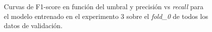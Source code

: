 \begin{figure}[H]
    \centering
    \caption{Curvas de F1-score en función del umbral y precisión vs \textit{recall} para el modelo entrenado en el experimento 3 sobre el \textit{fold\_0} de todos los datos de validación.}
    \label{fig:exp3-val-all-curves}
\end{figure}